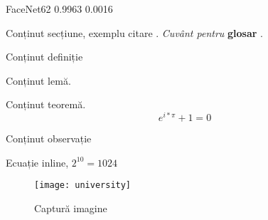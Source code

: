 FaceNet62 0.9963 0.0016

Conținut secțiune, exemplu citare \cite{hoare_csp}.
\textit{Cuvânt pentru} \textbf{glosar} .	

\begin{definition}
	Conținut definiție
\end{definition}

\begin{lemma}
	Conținut lemă.
\end{lemma}

\begin{theorem}
	Conținut teoremă.
	\[
		e^{i * \pi} + 1 = 0
	\]
\end{theorem}

\begin{remark}
	Conținut observație
\end{remark}

Ecuație inline, $2^{10} = 1024 $

\begin{figure}[h]
	\begin{center}
			\texttt{[image: university]}
	\end{center}
	\caption{Captură imagine}
\end{figure}